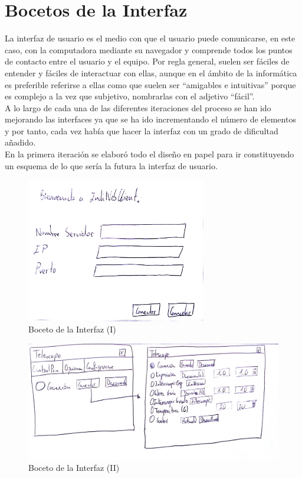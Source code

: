 \section{Bocetos de la Interfaz}
La interfaz de usuario es el medio con que el usuario puede comunicarse, en este caso, con la computadora mediante su navegador y comprende todos los puntos de contacto entre el usuario y el equipo. Por regla general, suelen ser fáciles de entender y fáciles de interactuar con ellas, aunque en el ámbito de la informática es preferible referirse a ellas como que suelen ser “amigables e intuitivas” porque es complejo a la vez que  subjetivo, nombrarlas con el adjetivo “fácil”.\cite{IU}\\

A lo largo de cada una de las diferentes iteraciones del proceso se han ido mejorando las interfaces ya que se ha ido incrementando el número de elementos y por tanto, cada vez había que hacer la interfaz con un grado de dificultad añadido.\\

En la primera iteración se elaboró todo el diseño en papel para ir constituyendo un esquema de lo que sería la futura la interfaz de usuario.\\
\begin{figure}[htb]
\centering
\includegraphics[width=0.7\textwidth]{./imagenes/boceto1}
\caption{Boceto de la Interfaz (I)} \label{fig:boceto1}
\end{figure}

\begin{figure}[htb]
\centering
\includegraphics[width=1\textwidth]{./imagenes/boceto2}
\caption{Boceto de la Interfaz (II)} \label{fig:boceto2}
\end{figure}

